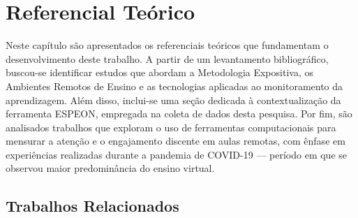 \chapter{Referencial Teórico}\label{sec:theory}

Neste capítulo são apresentados os referenciais teóricos que fundamentam o desenvolvimento deste trabalho. A partir de um levantamento bibliográfico, buscou-se identificar estudos que abordam a Metodologia Expositiva, os Ambientes Remotos de Ensino e as tecnologias aplicadas ao monitoramento da aprendizagem. Além disso, inclui-se uma seção dedicada à contextualização da ferramenta ESPEON, empregada na coleta de dados desta pesquisa. Por fim, são analisados trabalhos que exploram o uso de ferramentas computacionais para mensurar a atenção e o engajamento discente em aulas remotas, com ênfase em experiências realizadas durante a pandemia de COVID-19 — período em que se observou maior predominância do ensino virtual.



\section{Trabalhos Relacionados}\label{sec:related}

